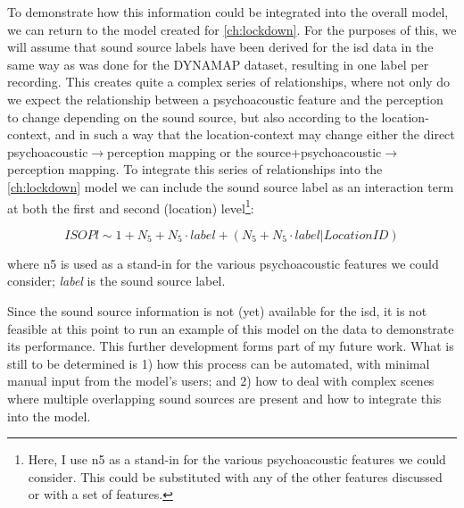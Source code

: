 To demonstrate how this information could be integrated into the overall model, we can return to the model created for \cref{ch:lockdown}. For the purposes of this, we will assume that sound source labels have been derived for the \gls{isd} data in the same way as was done for the DYNAMAP dataset, resulting in one label per recording. This creates quite a complex series of relationships, where not only do we expect the relationship between a psychoacoustic feature and the perception to change depending on the sound source, but also according to the location-context, and in such a way that the location-context may change either the direct psychoacoustic$\rightarrow$perception mapping or the source+psychoacoustic$\rightarrow$perception mapping. To integrate this series of relationships into the \cref{ch:lockdown} model we can include the sound source label as an interaction term at both the first and second (location) level\footnote{Here, I use \gls{n5} as a stand-in for the various psychoacoustic features we could consider. This could be substituted with any of the other features discussed or with a set of features.}:

\begin{equation}
  \label{eqn:integSource}
      ISOPl \sim 1 + N_5 + N_5 \cdot label + (N_5 + N_5 \cdot label | LocationID)
  \end{equation}

where \gls{n5} is used as a stand-in for the various psychoacoustic features we could consider; \emph{label} is the sound source label.

Since the sound source information is not (yet) available for the \gls{isd}, it is not feasible at this point to run an example of this model on the data to demonstrate its performance. This further development forms part of my future work.  What is still to be determined is 1) how this process can be automated, with minimal manual input from the model's users; and 2) how to deal with complex scenes where multiple overlapping sound sources are present and how to integrate this into the model.

